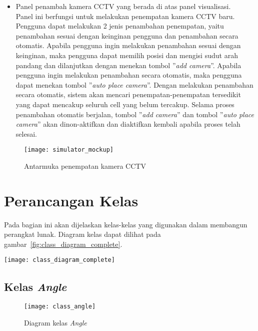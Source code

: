 \begin{enumerate}
\begin{itemize}
		\item Panel penambah kamera CCTV yang berada di atas panel visualisasi.\\
		Panel ini berfungsi untuk melakukan penempatan kamera CCTV baru. Pengguna dapat melakukan 2 jenis penambahan penempatan, yaitu penambahan sesuai dengan keinginan pengguna dan penambahan secara otomatis. Apabila pengguna ingin melakukan penambahan sesuai dengan keinginan, maka pengguna dapat memilih posisi dan mengisi sudut arah pandang dan dilanjutkan dengan menekan tombol ''\textit{add camera}''. Apabila pengguna ingin melakukan penambahan secara otomatis, maka pengguna dapat menekan tombol ''\textit{auto place camera}''. Dengan melakukan penambahan secara otomatis, sistem akan mencari penempatan-penempatan tersedikit yang dapat mencakup seluruh cell yang belum tercakup. Selama proses penambahan otomatis berjalan, tombol ''\textit{add camera}'' dan tombol ''\textit{auto place camera}'' akan dinon-aktifkan dan diaktifkan kembali apabila proses telah selesai.
	\end{itemize}
	\begin{figure}[h]
		\centering  
		\texttt{[image: simulator\_mockup]}
		\caption[Antarmuka penempatan kamera CCTV]{Antarmuka penempatan kamera CCTV}
		\label{fig:simulator_mockup}
	\end{figure}
\end{enumerate}

\section{Perancangan Kelas}
Pada bagian ini akan dijelaskan kelas-kelas yang digunakan dalam membangun perangkat lunak. Diagram kelas dapat dilihat pada gambar~\ref{fig:class_diagram_complete}.
\begin{sidewaysfigure}
	\centering  
	\texttt{[image: class\_diagram\_complete]}
	\caption[Kelas diagram]{Kelas diagram}
	\label{fig:class_diagram_complete}
\end{sidewaysfigure}

\subsection{Kelas \textit{Angle}}
\begin{figure}[H]
	\centering  
	\texttt{[image: class\_angle]}
	\caption[Diagram kelas \textit{Angle}]{Diagram kelas \textit{Angle}}
	\label{fig:class_angle}
\end{figure}
	
